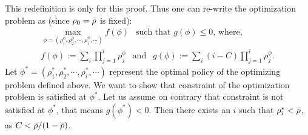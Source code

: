 This redefinition is only for this proof.   Thus one can re-write the optimization problem as (since $\rho_0 = {\bar \rho}$ is fixed):
\begin{eqnarray*}    
	\max_{ \phi = ( \rho_1^\phi, \rho_2^\phi, \cdots, \rho_i^\phi, \cdots  ) } f (\phi) \ \  \mbox{ such that }  
	g(\phi) \leq 0   \mbox{,  where, } \\
	f(\phi) :=    \sum_i  \prod_{j=1}^i \rho_j^\phi \ \ \mbox{ and }  \ \  g(\phi) :=\sum_i   (i - C)   \prod_{j=1}^i \rho_j^\phi    .  
\end{eqnarray*}
%
Let $\phi^* = \left(\rho_1^*, \rho_2^*, \cdots, \rho_i^*, \cdots \right )$  represent the optimal policy of the optimizing problem defined above. We want to show that constraint of the optimization problem is satisfied at $\phi^*$.
Let us assume on contrary that constraint is not satisfied at $\phi^*$, that means $g(\phi^*) < 0$. Then there exists an $i$ such that $\rho_i^* < {\bar \rho}$, as $C < {\bar \rho} / (1-{\bar \rho})$.
%

